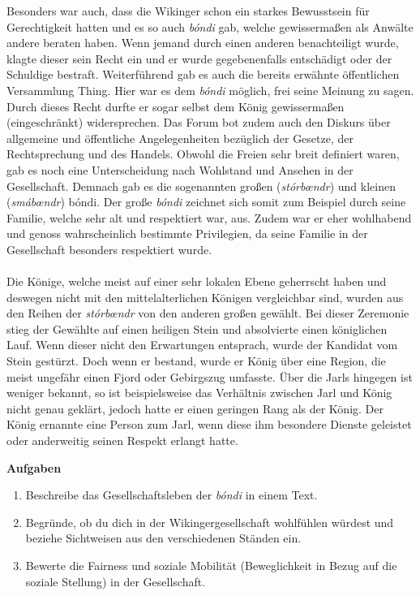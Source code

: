 \documentclass[12pt,a4paper,ngerman,openany]{book}
\newcommand{\aufgaben}[1]{
  \begin{tcolorbox}
    \textbf{Aufgaben}
    \begin{enumerate}
      #1
    \end{enumerate}
  \end{tcolorbox}
} %
\newcommand{\erklaer}[2]{\leavevmode\marginpar{\footnotesize \textbf{#1:}\\#2}\ignorespaces} %
\begin{document}
Besonders war auch, dass die Wikinger schon ein starkes Bewusstsein für Gerechtigkeit hatten und es so auch \textit{bóndi} gab, welche gewissermaßen als Anwälte andere beraten haben. Wenn jemand durch einen anderen benachteiligt wurde, klagte dieser sein Recht ein und er wurde gegebenenfalls entschädigt oder der Schuldige bestraft. Weiterführend gab es auch die bereits erwähnte öffentlichen Versammlung \glqq Thing\grqq{}. Hier war es dem \textit{bóndi} möglich, frei seine Meinung zu sagen. Durch dieses Recht durfte er sogar selbst dem König gewissermaßen (eingeschränkt) widersprechen. Das Forum bot zudem auch den Diskurs über allgemeine und öffentliche Angelegenheiten bezüglich der Gesetze, der Rechtsprechung und des Handels.
Obwohl die Freien sehr breit definiert waren, gab es noch eine Unterscheidung nach Wohlstand und Ansehen in der Gesellschaft. Demnach gab es die sogenannten großen (\textit{stórbœndr}) und kleinen (\textit{smábœndr}) bóndi. 
Der große \textit{bóndi} zeichnet sich somit zum Beispiel durch seine Familie, welche sehr alt und respektiert war, aus. Zudem war er eher wohlhabend und genoss wahrscheinlich bestimmte Privilegien, da seine Familie in der Gesellschaft besonders respektiert wurde.\\\\
Die Könige, welche meist auf einer sehr lokalen Ebene geherrscht haben und deswegen nicht mit den mittelalterlichen Königen vergleichbar sind, wurden aus den Reihen der \textit{stórbœndr} von den anderen \glqq großen\grqq{} \erklaer{\textit{bœndr}}{Plural von \textit{bóndi}.} gewählt. Bei dieser Zeremonie stieg der Gewählte auf einen heiligen Stein und absolvierte einen königlichen Lauf. Wenn dieser nicht den Erwartungen entsprach, wurde der Kandidat vom Stein gestürzt. Doch wenn er bestand, wurde er König über eine Region, die meist ungefähr einen Fjord oder Gebirgszug umfasste.
Über die Jarls hingegen ist weniger bekannt, so ist beispielsweise das Verhältnis zwischen Jarl und König nicht genau geklärt, jedoch hatte er einen geringen Rang als der König. Der König ernannte eine Person zum Jarl, wenn diese ihm besondere Dienste geleistet oder anderweitig seinen Respekt erlangt hatte.

\aufgaben{
  \item Beschreibe das Gesellschaftsleben der \textit{bóndi} in einem Text.
  \item Begründe, ob du dich in der Wikingergesellschaft wohlfühlen würdest und beziehe Sichtweisen aus den verschiedenen Ständen ein.
  \item Bewerte die Fairness und soziale Mobilität (Beweglichkeit in Bezug auf die soziale Stellung) in der Gesellschaft.
}
\end{document}

